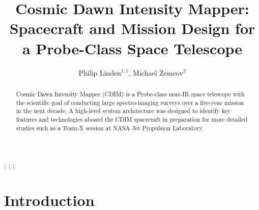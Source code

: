 \documentclass{ws-jai}
\begin{document}
\newcommand{\Ltwo}{L$_2$}
\newcommand{\red}[1]{{\color{red} #1}}

\catchline{}{}{}{}{} %


\title{Cosmic Dawn Intensity Mapper: \\Spacecraft and Mission Design for a Probe-Class Space Telescope}

\author{Philip Linden$^{1,\dagger}$, Michael Zemcov$^{2}$}

\address{
$^{1}$Department of Mechanical Engineering, Kate Gleason College of Engineering, Rochester
Institute of Technology, Rochester, NY 14623, USA, pjl7651@rit.edu\\
$^{2}$Center for Detectors, School of Physics and Astronomy, Rochester
Institute of Technology, Rochester, NY 14623, USA, zemcov@cfd.rit.edu
}

\maketitle


\begin{history}
;
;
;
\end{history}

\begin{abstract}
  Cosmic Dawn Intensity Mapper (CDIM) is a Probe-class near-IR space telescope with the scientific goal of conducting large spectro-imaging surveys over a five-year mission in the next decade.
  A high-level system architecture was designed to identify key features and technologies aboard the CDIM spacecraft in preparation for more detailed studies such as a Team-X session at NASA Jet Propulsion Laboratory.
\end{abstract}



\section{Introduction}
\label{sec:introduction}
\end{document}
